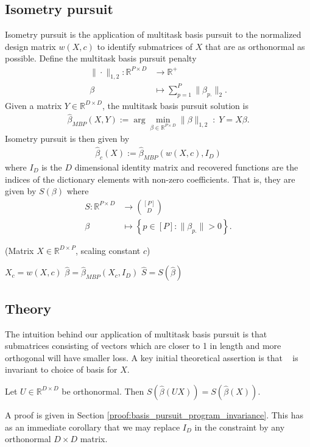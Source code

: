 \subsection{Isometry pursuit}

Isometry pursuit is the application of multitask basis pursuit to the normalized design matrix $w(X, c)$ to identify submatrices of $ X$ that are as orthonormal as possible.
Define the multitask basis pursuit penalty 
\begin{align}
\label{eq:bp}
\| \cdot \|_{1,2}: \mathbb R^{P \times D} &\to \mathbb R^+ \\ 
\beta &\mapsto  \sum_{p=1}^P  \|\beta_{p.}\|_2.
\end{align}
Given a matrix $Y \in \mathbb R^{D \times D}$, the multitask basis pursuit solution is
\begin{align}
\label{prog:multitask_basis_pursuit}
\widehat \beta_{MBP} (X, Y)  := \arg \min_{\beta \in \mathbb R^{P \times D}} \| \beta \|_{1,2} \; : \;Y =  X \beta.
\end{align}
Isometry pursuit is then given by
\begin{align}
\label{prog:isometry_pursuit}
\widehat \beta_c ( X) := \widehat \beta_{MBP} ( w(X,c), I_D )
\end{align}
where $I_D$ is the $D$ dimensional identity matrix and recovered functions are the indices of the dictionary elements with non-zero coefficients.
That is, they are given by $S(\beta)$ where
\begin{align}
S: \mathbb{R}^{P \times D} &\to \binom{[P]}{D} \\
\beta &\mapsto \left\{ p \in [P] :  \|\beta_{p.}\| > 0 \right\}.
\end{align}
\begin{algorithm}[H]
\caption{\isometrypursuit(Matrix ${X} \in \mathbb{R}^{D \times P}$, scaling constant $c$)}
\begin{algorithmic}[1]
 $X_c = w({X},c)$
 $\widehat \beta = \widehat \beta_{MBP} (X_c, I_D)$
 $\widehat{S} = S (\widehat \beta)$
\end{algorithmic}
\end{algorithm}

\subsection{Theory}

The intuition behind our application of multitask basis pursuit is that submatrices consisting of vectors which are closer to 1 in length and more orthogonal will have smaller loss.
A key initial theoretical assertion is that \isometrypursuit~ is invariant to choice of basis for $ X$.
\begin{proposition}
\label{prop:basis_pursuit_selection_invariance}
Let $U \in \mathbb R^{D \times D}$ be orthonormal.
Then $S(\widehat \beta  (U  X)) = S(\widehat \beta ( X))$.
\end{proposition}
A proof is given in Section \ref{proof:basis_pursuit_program_invariance}.
This has as an immediate corollary that we may replace $I_D$ in the constraint by any orthonormal $D \times D$ matrix.

